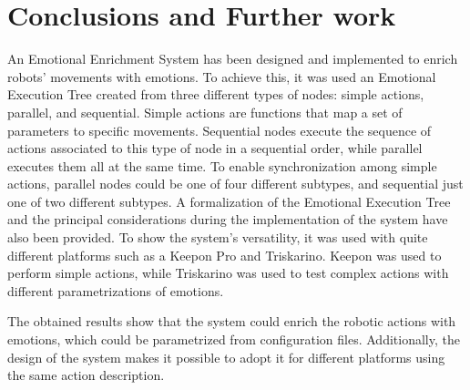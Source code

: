\documentclass[letterpaper, 10 pt, conference]{ieeeconf}  %
\begin{document}
\section{Conclusions and Further work}
An Emotional Enrichment System has been designed and implemented to enrich robots' movements with emotions. To achieve this, it was used an Emotional Execution Tree created from three different types of nodes: simple actions, parallel, and sequential. Simple actions are functions that map a set of parameters to specific movements. Sequential nodes execute the sequence of actions associated to this type of node in a sequential order, while parallel executes them all at the same time. To enable synchronization among simple actions, parallel nodes could be one of four different subtypes, and sequential just one of two different subtypes. A formalization of the Emotional Execution Tree and the principal considerations during the implementation of the system have also been provided. To show the system's versatility, it was used with quite different platforms such as a Keepon Pro and Triskarino. Keepon was used to perform simple actions, while Triskarino was used to test complex actions with different parametrizations of emotions.

The obtained results show that the system could enrich the robotic actions with emotions, which could be parametrized from configuration files. Additionally, the design of the system makes it possible to  adopt it for different platforms using the same action description.
%



\addtolength{\textheight}{-12cm}
\end{document}
